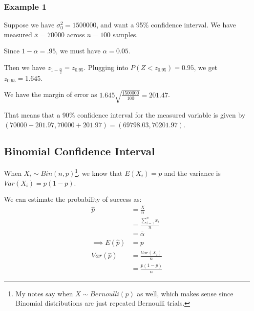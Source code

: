                     \subsubsection{Example 1} %
                    \label{ssub:example_1}
                        Suppose we have $\sigma_0^2 = 1 500 000$, and want a 95\% confidence interval.
                        We have measured $\bar{x} = 70 000$ across $n = 100$ samples.

                        Since $1 - \alpha = .95$, we must have $\alpha = 0.05$.

                        Then we have $z_{1 - \frac{\alpha}{2}} = z_{0.95}$.
                        Plugging into $P(Z < z_{0.95}) = 0.95$, we get $z_{0.95} = 1.645$.

                        We have the margin of error as $1.645 \sqrt{\frac{1 500 000}{100}} = 201.47$.

                        That means that a 90\% confidence interval for the measured variable is given by $(70 000 - 201.97, 70 000 + 201.97) = (69798.03, 70201.97)$.
                \subsection{Binomial Confidence Interval} %
                \label{sub:binomial_confidence_interval}
                    When $X_i \sim Bin(n, p)$\footnote{My notes say when $X \sim Bernoulli(p)$ as well, which makes sense since Binomial distributions are just repeated Bernoulli trials.}, we know that $E(X_i) = p$ and the variance is $Var(X_i) = p(1 - p)$.

                    We can estimate the probability of success as:
                    \begin{align*}
                        \hat{p} &= \frac{X}{n} \\
                        &= \frac{ \sum_{i=1}^n x_i}{n} \\
                        &= \bar{\alpha} \\
                        \implies E(\hat{p}) &= p \\
                        Var(\hat{p}) &= \frac{Var(X_i)}{n} \\
                        &= \frac{p(1-p)}{n}
                    \end{align*}

